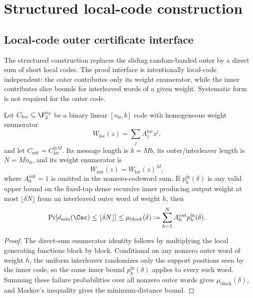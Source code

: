 

\section{Structured local-code construction}
\label{sec:structured-local-code}

\subsection{Local-code outer certificate interface}
\label{subsec:local-code-outer-interface}

The structured construction replaces the sliding random-banded outer by a direct sum of short local codes.  The proof
interface is intentionally local-code independent: the outer contributes only its weight enumerator, while the inner
contributes slice bounds for interleaved words of a given weight.  Systematic form is not required for the outer code.

\begin{lemma}
\label{lem:block-outer-first-moment-interface}
Let \(C_{\mathrm{loc}}\subseteq\F_2^{n_0}\) be a binary linear \([n_0,b]\) code with homogeneous weight enumerator
\[
W_{\mathrm{loc}}(z)=\sum_j A^{\mathrm{loc}}_j z^j,
\]
and let \(C_{\mathrm{out}}=C_{\mathrm{loc}}^{\oplus M}\).  Its message length is \(k=Mb\), its
outer/interleaver length is \(N=Mn_0\), and its weight enumerator is
\[
W_{\mathrm{out}}(z)=W_{\mathrm{loc}}(z)^M,
\]
where \(A_0^{\mathrm{out}}=1\) is omitted in the nonzero-codeword sum.  If \(p_h^{\mathrm{in}}(\delta)\) is any valid
upper bound on the fixed-tap dense recursive inner producing output weight at most \(\lfloor\delta N\rfloor\) from an
interleaved outer word of weight \(h\), then
\[
\Pr[d_{\min}(\Csc)\le \lfloor\delta N\rfloor]
\le
\mu_{\mathrm{block}}(\delta)
:=
\sum_{h=1}^{N} A_h^{\mathrm{out}}p_h^{\mathrm{in}}(\delta).
\]
\end{lemma}

\begin{proof}
The direct-sum enumerator identity follows by multiplying the local generating functions block by block.  Conditional
on any nonzero outer word of weight \(h\), the uniform interleaver randomizes only the support positions seen by the
inner code, so the same inner bound \(p_h^{\mathrm{in}}(\delta)\) applies to every such word.  Summing these failure
probabilities over all nonzero outer words gives \(\mu_{\mathrm{block}}(\delta)\), and Markov's inequality gives the
minimum-distance bound.
\end{proof}

